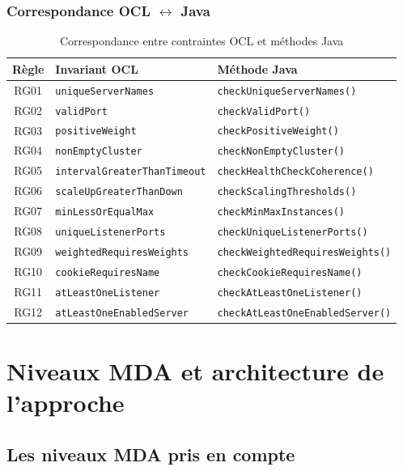 \documentclass[12pt,a4paper]{report}
\begin{document}
\subsection{Correspondance OCL $\leftrightarrow$ Java}

\begin{table}[H]
\centering
\caption{Correspondance entre contraintes OCL et méthodes Java}
\begin{tabular}{|c|l|l|}
\hline
\textbf{Règle} & \textbf{Invariant OCL} & \textbf{Méthode Java} \\
\hline
RG01 & \texttt{uniqueServerNames} & \texttt{checkUniqueServerNames()} \\
\hline
RG02 & \texttt{validPort} & \texttt{checkValidPort()} \\
\hline
RG03 & \texttt{positiveWeight} & \texttt{checkPositiveWeight()} \\
\hline
RG04 & \texttt{nonEmptyCluster} & \texttt{checkNonEmptyCluster()} \\
\hline
RG05 & \texttt{intervalGreaterThanTimeout} & \texttt{checkHealthCheckCoherence()} \\
\hline
RG06 & \texttt{scaleUpGreaterThanDown} & \texttt{checkScalingThresholds()} \\
\hline
RG07 & \texttt{minLessOrEqualMax} & \texttt{checkMinMaxInstances()} \\
\hline
RG08 & \texttt{uniqueListenerPorts} & \texttt{checkUniqueListenerPorts()} \\
\hline
RG09 & \texttt{weightedRequiresWeights} & \texttt{checkWeightedRequiresWeights()} \\
\hline
RG10 & \texttt{cookieRequiresName} & \texttt{checkCookieRequiresName()} \\
\hline
RG11 & \texttt{atLeastOneListener} & \texttt{checkAtLeastOneListener()} \\
\hline
RG12 & \texttt{atLeastOneEnabledServer} & \texttt{checkAtLeastOneEnabledServer()} \\
\hline
\end{tabular}
\end{table}

\chapter{Niveaux MDA et architecture de l'approche}

\section{Les niveaux MDA pris en compte}
\end{document}

